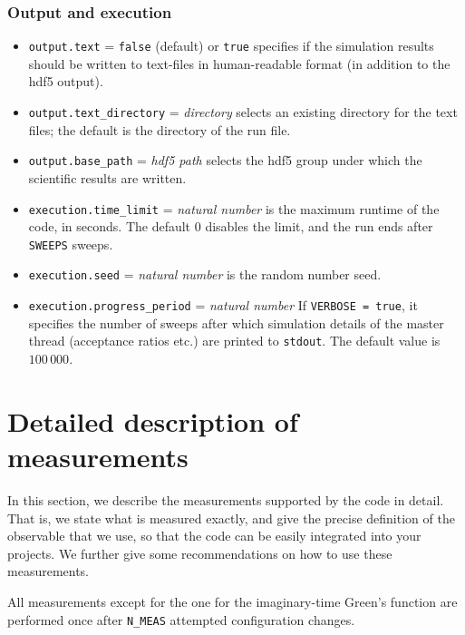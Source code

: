 \documentclass[aps,prb,floatfix,superscriptaddress,twocolumn,notitlepage]{revtex4-1}
\begin{document}
\subsubsection{Output and execution}

\begin{itemize}
\item \verb#output.text# = \verb#false# (default) or \verb#true# specifies if the simulation results should be written to text-files in human-readable format (in addition to the hdf5 output).

\item \verb#output.text_directory# = \emph{directory} selects an existing directory for the text files; the default is the directory of the run file.

\item \verb#output.base_path# = \emph{hdf5 path} selects the hdf5 group under which the scientific results are written.

\item \verb#execution.time_limit# = \emph{natural number} is the maximum runtime of the code, in seconds. The default $0$ disables the limit, and the run ends after \verb#SWEEPS# sweeps.

\item \verb#execution.seed# = \emph{natural number} is the random number seed.

\item \verb#execution.progress_period# = \emph{natural number} If \verb#VERBOSE = true#, it specifies the number of sweeps after which simulation details of the master thread (acceptance ratios etc.) are printed to \verb#stdout#. The default value is $100\,000$.
\end{itemize}

\section{Detailed description of measurements}
\label{measurements}
In this section, we describe the measurements supported by the code in detail. That is, we state what is measured exactly, and give the precise definition of the observable that we use, so that the code can be easily integrated into your projects. We further give some recommendations on how to use these measurements.	

All measurements except for the one for the imaginary-time Green's function are performed once after \verb#N_MEAS# attempted configuration changes.
\end{document}
